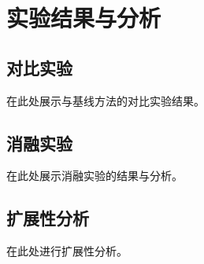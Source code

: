 
\chapter{实验结果与分析}

\section{对比实验}

在此处展示与基线方法的对比实验结果。

\section{消融实验}

在此处展示消融实验的结果与分析。

\section{扩展性分析}

在此处进行扩展性分析。
